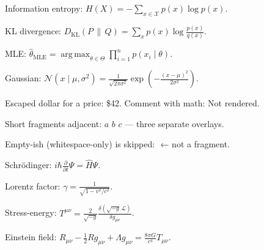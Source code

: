 \documentclass{article}
\DeclareMathOperator*{\argmax}{arg\,max}
\begin{document}

Information entropy: $H(X) = -\sum_{x \in \mathcal{X}} p(x) \log p(x)$.

KL divergence: $\displaystyle D_{\mathrm{KL}}(P \,\|\, Q) = \sum_{x} p(x)
\log\frac{p(x)}{q(x)}$.

MLE: $\hat{\theta}_{\text{MLE}} = \argmax_{\theta \in \Theta} \prod_{i=1}^{n}
p(x_i \mid \theta)$.

Gaussian: $\mathcal{N}(x \mid \mu, \sigma^2) = \frac{1}{\sqrt{2\pi\sigma^2}}
\exp\!\left(-\frac{(x-\mu)^2}{2\sigma^2}\right)$.


Escaped dollar for a price: \$42.  Comment with math: %
Not rendered.

Short fragments adjacent: $a$ $b$ $c$ — three separate overlays.

Empty-ish (whitespace-only) is skipped: $ $  ← not a fragment.


Schrödinger: $i \hbar \frac{\partial}{\partial t}\Psi = \hat{H}\Psi$.

Lorentz factor: $\gamma = \frac{1}{\sqrt{1 - v^2/c^2}}$.

Stress-energy: $T^{\mu\nu} = \frac{2}{\sqrt{-g}}\frac{\delta(\sqrt{-g}\,
\mathcal{L})}{\delta g_{\mu\nu}}$.

Einstein field: $R_{\mu\nu} - \tfrac{1}{2}R g_{\mu\nu} + \Lambda g_{\mu\nu} =
\frac{8\pi G}{c^4} T_{\mu\nu}$.
\end{document}
